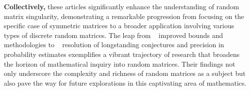 \newline\textbf{Collectively,} these articles significantly enhance the understanding of random matrix singularity, demonstrating a remarkable progression from focusing on the specific case of symmetric matrices to a broader application involving various types of discrete random matrices.
The leap from ~\cite{campos2020singularity} improved bounds and methodologies to ~\cite{jain2021singularity} resolution of longstanding conjectures and precision in probability estimates exemplifies a vibrant trajectory of research that broadens the horizon of mathematical inquiry into random matrices. 
Their findings not only underscore the complexity and richness of random matrices as a subject but also pave the way for future explorations in this captivating area of mathematics.